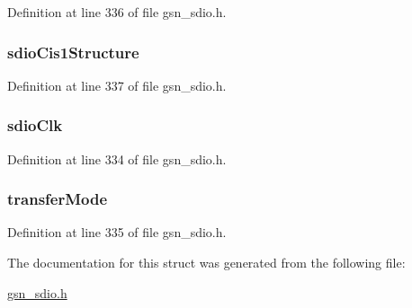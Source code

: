 Definition at line 336 of file gsn\_\-sdio.h.

\hypertarget{a00226_af0ecceae9290e2a184c9f8a9b7b98240}{
\subsubsection[{sdioCis1Structure}]{ {\bf sdioCis1Structure}}}
\label{a00226_af0ecceae9290e2a184c9f8a9b7b98240}


Definition at line 337 of file gsn\_\-sdio.h.

\hypertarget{a00226_a9bb0a1a9e7230a7a5933d66df575e742}{
\subsubsection[{sdioClk}]{ {\bf sdioClk}}}
\label{a00226_a9bb0a1a9e7230a7a5933d66df575e742}


Definition at line 334 of file gsn\_\-sdio.h.

\hypertarget{a00226_a87b2b2e6e271e18c41ed8104964dc1b7}{
\subsubsection[{transferMode}]{ {\bf transferMode}}}
\label{a00226_a87b2b2e6e271e18c41ed8104964dc1b7}


Definition at line 335 of file gsn\_\-sdio.h.



The documentation for this struct was generated from the following file:\begin{DoxyCompactItemize}
\item 
\hyperlink{a00584}{gsn\_\-sdio.h}\end{DoxyCompactItemize}

